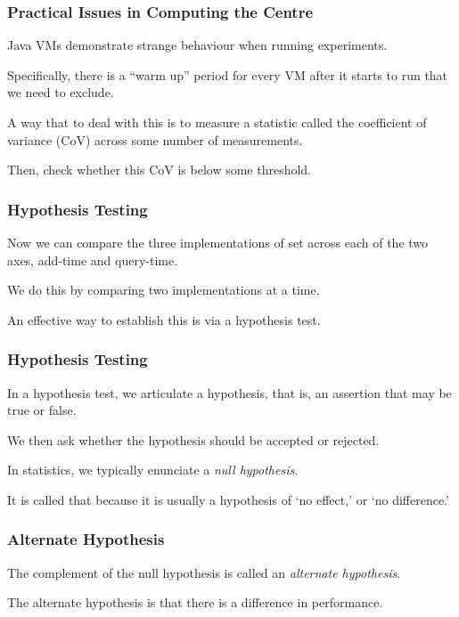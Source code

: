 \begin{frame}
\frametitle{Practical Issues in Computing the Centre}
\begin{changemargin}{1cm}

Java VMs demonstrate strange behaviour when running experiments. 

Specifically, there is a ``warm up''
	period for every VM after it starts to run
	that we need to exclude.


	A way that to deal with this
	is to measure a statistic called the coefficient
	of variance (CoV) across some number of measurements. 
	
	Then, check whether this
	CoV is below some threshold.

\end{changemargin}
\end{frame}

\begin{frame}
\frametitle{Hypothesis Testing}
\begin{changemargin}{1cm}

Now
we can compare the three implementations of set across
each of the two axes, add-time and query-time.

We do this by comparing two implementations at a time.

An effective way to establish
this is via a hypothesis test.

\end{changemargin}
\end{frame}


\begin{frame}
\frametitle{Hypothesis Testing}
\begin{changemargin}{1cm}

In a hypothesis test, we articulate a hypothesis, that is,
an assertion that may be true or false. 

We then ask whether
the hypothesis should be accepted or rejected.

In statistics,
we typically enunciate a \emph{null hypothesis}.

It is called that because it is usually a hypothesis of
`no effect,' or `no difference.' 

\end{changemargin}
\end{frame}


\begin{frame}
\frametitle{Alternate Hypothesis}
\begin{changemargin}{1cm}

The complement of the null hypothesis is called an
\emph{alternate hypothesis}.

The alternate
hypothesis is that there is a difference in performance.

\end{changemargin}
\end{frame}

